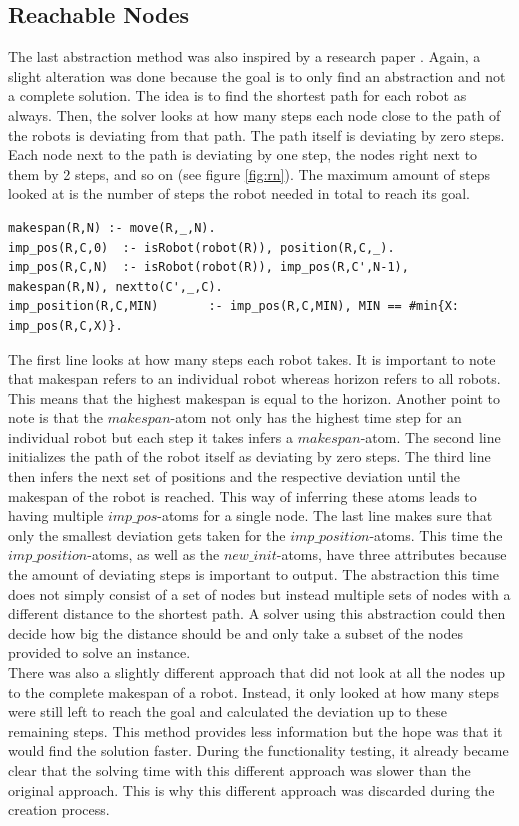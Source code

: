 \documentclass[runningheads]{llncs}
\begin{document}
\subsection{Reachable Nodes}
The last abstraction method was also inspired by a research paper \cite{rn}. Again, a slight alteration was done because the goal is to only find an abstraction and not a complete solution. The idea is to find the shortest path for each robot as always. Then, the solver looks at how many steps each node close to the path of the robots is deviating from that path. The path itself is deviating by zero steps. Each node next to the path is deviating by one step, the nodes right next to them by 2  steps, and so on (see figure \ref{fig:rn}). The maximum amount of steps looked at is the number of steps the robot needed in total to reach its goal. 
\begin{verbatim}
makespan(R,N) :- move(R,_,N).
imp_pos(R,C,0) 	:- isRobot(robot(R)), position(R,C,_).
imp_pos(R,C,N) 	:- isRobot(robot(R)), imp_pos(R,C',N-1), makespan(R,N), nextto(C',_,C).
imp_position(R,C,MIN) 		:- imp_pos(R,C,MIN), MIN == #min{X: imp_pos(R,C,X)}.
\end{verbatim}
The first line looks at how many steps each robot takes. It is important to note that makespan refers to an individual robot whereas horizon refers to all robots. This means that the highest makespan is equal to the horizon. Another point to note is that the $makespan$-atom not only has the highest time step for an individual robot but each step it takes infers a $makespan$-atom. The second line initializes the path of the robot itself as deviating by zero steps. The third line then infers the next set of positions and the respective deviation until the makespan of the robot is reached. This way of inferring these atoms leads to having multiple $imp\_pos$-atoms for a single node. The last line makes sure that only the smallest deviation gets taken for the $imp\_position$-atoms. This time the $imp\_position$-atoms, as well as the $new\_init$-atoms, have three attributes because the amount of deviating steps is important to output. The abstraction this time does not simply consist of a set of nodes but instead multiple sets of nodes with a different distance to the shortest path. A solver using this abstraction could then decide how big the distance should be and only take a subset of the nodes provided to solve an instance. \\
There was also a slightly different approach that did not look at all the nodes up to the complete makespan of a robot. Instead, it only looked at how many steps were still left to reach the goal and calculated the deviation up to these remaining steps. This method provides less information but the hope was that it would find the solution faster. During the functionality testing, it already became clear that the solving time with this different approach was slower than the original approach. This is why this different approach was discarded during the creation process.
\end{document}
